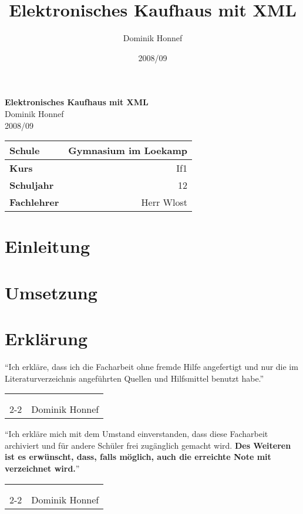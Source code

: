 \documentclass[12pt,oneside,ngerman,a4paper,bibgerm]{scrreprt}
\author{Dominik Honnef}
\title{Elektronisches Kaufhaus mit XML}
\date{2008/09}
\makeatletter
\newcommand{\signature}[1]{
  \vspace*{\bigskipamount}
  \hfill
  \begin{tabularx}{0.95\linewidth}{Xr}
    \\
    \\
    \\
    \cline{2-2}
    & \makebox[4cm][r]#1
  \end{tabularx}
  \vspace*{\bigskipamount}
}
\renewcommand*{\lstlistoflistings}{%
  \begingroup
    \if@twocolumn
      \@restonecoltrue\onecolumn
    \else
      \@restonecolfalse
    \fi
    \lol@heading
    \setlength{\parskip}{\z@}%
    \setlength{\parindent}{\z@}%
    \setlength{\parfillskip}{\z@ \@plus 1fil}%
    \@starttoc{lol}%
    \if@restonecol\twocolumn\fi
  \endgroup
}
\renewcommand*{\chapterpagestyle}{scrheadings}
\makeatother
\begin{document}
\onehalfspacing
\clearpage
\begingroup
\renewcommand*{\chapterpagestyle}{empty}
\pagestyle{empty}
\vspace*{\fill}
\begin{center}
  \textbf{\huge{Elektronisches Kaufhaus mit XML}} \\
  \bigskip
  \small{Dominik Honnef} \\
  \bigskip
  \small{2008/09}
\end{center}
\vspace*{\fill}
\begin{tabular}{|l|r|}
  \hline
  \textbf{Schule} & Gymnasium im Loekamp \\
  \hline
  \textbf{Kurs} & If1 \\
  \hline
  \textbf{Schuljahr} & 12 \\
  \hline
  \textbf{Fachlehrer} & Herr Wlost \\
  \hline
\end{tabular}
\clearpage
\tableofcontents{}
\clearpage
\endgroup
\newpage
\chapter{Einleitung}
\chapter{Umsetzung}
\lstlistoflistings
\listoffigures



\nocite{pdf:xslt}
\nocite{pdf:xquery}
\nocite{pdf:xml}
\nocite{pdf:xslfo}
\nocite{wiki:de:xml}
\nocite{book:phpmysql}

\chapter*{Erklärung}
"`Ich erkläre, dass ich die Facharbeit ohne fremde
Hilfe angefertigt und nur die
im Literaturverzeichnis angeführten Quellen und Hilfsmittel benutzt habe."' \\
\signature{Dominik Honnef}

"`Ich erkläre mich mit dem Umstand einverstanden, dass diese
Facharbeit archiviert und für andere Schüler frei zugänglich gemacht
wird. \textbf{Des Weiteren ist es erwünscht, dass, falls möglich, auch die
erreichte Note mit verzeichnet wird.}"' \\
\signature{Dominik Honnef}
\end{document}
